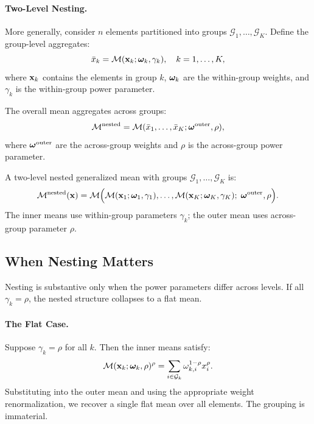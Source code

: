 \paragraph{Two-Level Nesting.}
More generally, consider $n$ elements partitioned into groups $\mathcal{G}_1, \ldots, \mathcal{G}_K$. Define the group-level aggregates:
\begin{equation}
\bar{x}_k = \mathcal{M}(\mathbf{x}_k; \boldsymbol{\omega}_k, \gamma_k), \quad k = 1, \ldots, K,
\label{eq:group-aggregates}
\end{equation}
where $\mathbf{x}_k$ contains the elements in group $k$, $\boldsymbol{\omega}_k$ are the within-group weights, and $\gamma_k$ is the within-group power parameter.

The overall mean aggregates across groups:
\begin{equation}
\mathcal{M}^{\text{nested}} = \mathcal{M}(\bar{x}_1, \ldots, \bar{x}_K; \boldsymbol{\omega}^{\text{outer}}, \rho),
\label{eq:overall-nested}
\end{equation}
where $\boldsymbol{\omega}^{\text{outer}}$ are the across-group weights and $\rho$ is the across-group power parameter.

\begin{definition}
\label{def:nested-mean}
A two-level nested generalized mean with groups $\mathcal{G}_1, \ldots, \mathcal{G}_K$ is:
\begin{equation}
\mathcal{M}^{\text{nested}}(\mathbf{x}) = \mathcal{M}\Big( \mathcal{M}(\mathbf{x}_1; \boldsymbol{\omega}_1, \gamma_1), \ldots, \mathcal{M}(\mathbf{x}_K; \boldsymbol{\omega}_K, \gamma_K); \; \boldsymbol{\omega}^{\text{outer}}, \rho \Big).
\end{equation}
The inner means use within-group parameters $\gamma_k$; the outer mean uses across-group parameter $\rho$.
\end{definition}

\subsection{When Nesting Matters}
\label{subsec:when-nesting-matters}

Nesting is substantive only when the power parameters differ across levels. If all $\gamma_k = \rho$, the nested structure collapses to a flat mean.

\paragraph{The Flat Case.}
Suppose $\gamma_k = \rho$ for all $k$. Then the inner means satisfy:
\begin{equation}
\mathcal{M}(\mathbf{x}_k; \boldsymbol{\omega}_k, \rho)^\rho = \sum_{i \in \mathcal{G}_k} \omega_{k,i}^{1-\rho} x_i^\rho.
\label{eq:inner-flat}
\end{equation}
Substituting into the outer mean and using the appropriate weight renormalization, we recover a single flat mean over all elements. The grouping is immaterial.

